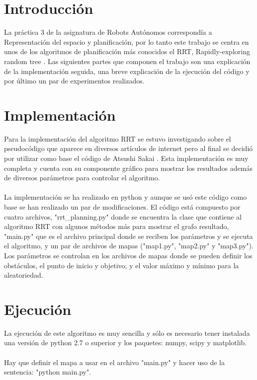 \documentclass[14pt]{extarticle}
\theoremstyle{definition}
\theoremstyle{remark}
\begin{document}
\section{Introducción}\label{sec:introduccion}
La práctica 3 de la asignatura de Robots Autónomos correspondía a Representación del espacio y planificación, por lo tanto este trabajo se centra en unos de los algoritmos de planificación más conocidos el RRT, Rapidly-exploring random tree \citep{wiki:rrt}. Las siguientes partes que componen el trabajo son una explicación de la implementación seguida, una breve explicación de la ejecución del código y por último un par de experimentos realizados.
\section{Implementación}\label{sec:implementacion}
Para la implementación del algoritmo RRT se estuvo investigando sobre el pseudocódigo que aparece en diversos artículos de internet pero al final se decidió por utilizar como base el código de Atsushi Sakai \citep{github:codigo_base}. Esta implementación es muy completa y cuenta con su componente gráfico para mostrar los resultados además de diversos parámetros para controlar el algoritmo.\\\\
La implementación se ha realizado en python y aunque se usó este código como base se han realizado un par de modificaciones. El código está compuesto por cuatro archivos, "rrt\_planning.py" donde se encuentra la clase que contiene al algoritmo RRT con algunos métodos más para mostrar el grafo resultado, "main.py" que es el archivo principal donde se reciben los parámetros y se ejecuta el algoritmo, y un par de archivos de mapas ("map1.py", "map2.py" y "map3.py"). Los parámetros se controlan en los archivos de mapas donde se pueden definir los obstáculos, el punto de inicio y objetivo; y el valor máximo y mínimo para la aleatoriedad.

\section{Ejecución}\label{sec:ejecucion}
La ejecución de este algoritmo es muy sencilla y sólo es necesario tener instalada una versión de python 2.7 o superior y los paquetes: numpy, scipy y matplotlib.\\\\Hay que definir el mapa a usar en el archivo "main.py" y hacer uso de la sentencia: "python main.py".
\end{document}
